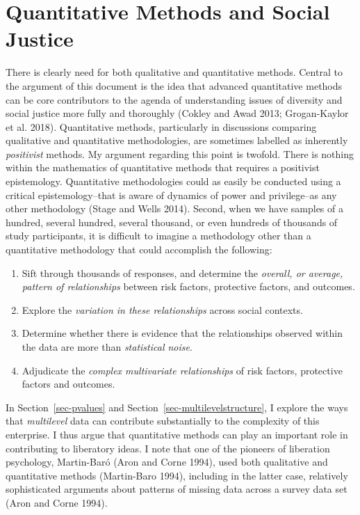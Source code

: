 \documentclass[
  letterpaper,
  DIV=11,
  numbers=noendperiod]{scrreprt}
\providecommand{\tightlist}{%
  \setlength{\itemsep}{0pt}\setlength{\parskip}{0pt}}\usepackage{longtable,booktabs,array}
\begin{document}
\hypertarget{quantitative-methods-and-social-justice}{%
\section{Quantitative Methods and Social
Justice}\label{quantitative-methods-and-social-justice}}

There is clearly need for both qualitative and quantitative methods.
Central to the argument of this document is the idea that advanced
quantitative methods can be core contributors to the agenda of
understanding issues of diversity and social justice more fully and
thoroughly (Cokley and Awad 2013; Grogan-Kaylor et al. 2018).
Quantitative methods, particularly in discussions comparing qualitative
and quantitative methodologies, are sometimes labelled as inherently
\emph{positivist} methods. My argument regarding this point is twofold.
There is nothing within the mathematics of quantitative methods that
requires a positivist epistemology. Quantitative methodologies could as
easily be conducted using a critical epistemology--that is aware of
dynamics of power and privilege--as any other methodology (Stage and
Wells 2014). Second, when we have samples of a hundred, several hundred,
several thousand, or even hundreds of thousands of study participants,
it is difficult to imagine a methodology other than a quantitative
methodology that could accomplish the following:

\begin{enumerate}
\def\labelenumi{\arabic{enumi}.}
\tightlist
\item
  Sift through thousands of responses, and determine the \emph{overall,
  or average, pattern of relationships} between risk factors, protective
  factors, and outcomes.
\item
  Explore the \emph{variation in these relationships} across social
  contexts.
\item
  Determine whether there is evidence that the relationships observed
  within the data are more than \emph{statistical noise}.
\item
  Adjudicate the \emph{complex multivariate relationships} of risk
  factors, protective factors and outcomes.
\end{enumerate}

In Section~\ref{sec-pvalues} and Section~\ref{sec-multilevelstructure},
I explore the ways that \emph{multilevel} data can contribute
substantially to the complexity of this enterprise. I thus argue that
quantitative methods can play an important role in contributing to
liberatory ideas. I note that one of the pioneers of liberation
psychology, Martin-Baró (Aron and Corne 1994), used both qualitative and
quantitative methods (Martin-Baro 1994), including in the latter case,
relatively sophisticated arguments about patterns of missing data across
a survey data set (Aron and Corne 1994).
\end{document}
